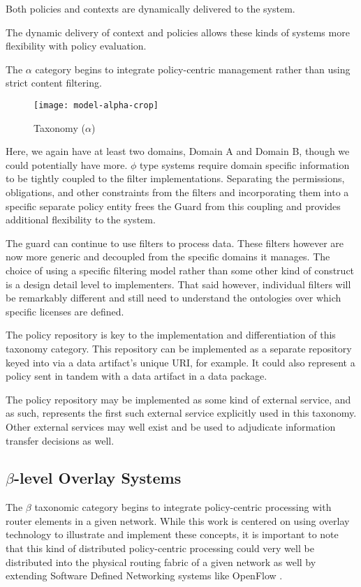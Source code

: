 Both policies and contexts are dynamically delivered to the system.

The dynamic delivery of context and policies allows these kinds of systems more flexibility with policy evaluation.

The $\alpha$ category begins to integrate policy-centric management rather than using strict content filtering.

\begin{figure}[!t]
\centering
\texttt{[image: model-alpha-crop]}
\caption{Taxonomy ($\alpha$)}
\label{fig:model:taxonomy-alpha}
\end{figure}

Here, we again have at least two domains, Domain A and Domain B, though we could potentially have more.  $\phi$ type systems require domain specific information to be tightly coupled to the filter implementations.  Separating the permissions, obligations, and other constraints from the filters and incorporating them into a specific separate policy entity frees the Guard from this coupling and provides additional flexibility to the system.

The guard can continue to use filters to process data.  These filters however are now more generic and decoupled from the specific domains it manages.  The choice of using a specific filtering model rather than some other kind of construct is a design detail level to implementers.  That said however, individual filters will be remarkably different and still need to understand the ontologies over which specific licenses are defined.

The policy repository is key to the implementation and differentiation of this taxonomy category.  This repository can be implemented as a separate repository keyed into via a data artifact's unique URI, for example.  It could also represent a policy sent in tandem with a data artifact in a data package.

The policy repository may be implemented as some kind of external service, and as such, represents the first such external service explicitly used in this taxonomy.  Other external services may well exist and be used to adjudicate information transfer decisions as well.

\subsection{$\beta$-level Overlay Systems}
The $\beta$ taxonomic category begins to integrate policy-centric processing with router elements in a given network.  While this work is centered on using overlay technology to illustrate and implement these concepts, it is important to note that this kind of distributed policy-centric processing could very well be distributed into the physical routing fabric of a given network as well by extending Software Defined Networking systems like OpenFlow \cite{proposal:openflow}.

